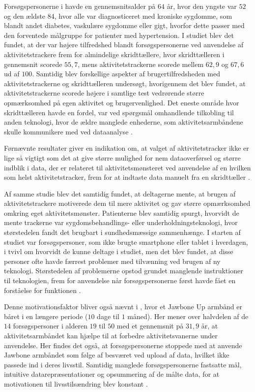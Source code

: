 Forsøgspersonerne i \citeauthor{mercer2016} havde en gennemsnitsalder på $64$ år, hvor den yngste var $52$ og den ældste $84$, hvor alle var diagnosticeret med kroniske sygdomme, som blandt andet diabetes, vaskulære sygdomme eller gigt, hvorfor dette passer med den forventede målgruppe for patienter med hypertension. I studiet blev det fundet, at der var højere tilfredshed blandt forsøgspersonerne ved anvendelse af aktivitetstrackere frem for almindelige skridttællere, hvor skridttælleren i gennemsnit scorede $55,7$, mens aktivitetstrackerne scorede mellem $62,9$ og $67,6$ ud af $100$. Samtidig blev forskellige aspekter af brugertilfredsheden med aktivitetstrackerne og skridttælleren undersøgt, hvorigennem det blev fundet, at aktivitetstrackerne scorede højere i samtlige test vedrørende større opmærksomhed på egen aktivitet og brugervenlighed. Det eneste område hvor skridttælleren havde en fordel, var ved spørgsmål omhandlende tilkobling til anden teknologi, hvor de ældre manglede enhederne, som aktivitetsarmbåndene skulle kommunikere med ved dataanalyse \citep{mercer2016}.

Førnævnte resultater giver en indikation om, at valget af aktivitetstracker ikke er lige så vigtigt som det at give større mulighed for nem dataoverførsel og større indblik i data, der er relateret til aktivitetsmønsteret ved anvendelse af en hvilken som helst aktivitetstracker, frem for at indtaste data manuelt fra en skridttæller \citep{mercer2016}.

Af samme studie blev det samtidig fundet, at deltagerne mente, at brugen af aktivitetstrackere motiverede dem til mere aktivitet og gav større opmærksomhed omkring eget aktivitetsmønster. Patienterne blev samtidig spurgt, hvorvidt de mente trackerne var sygdomsbehandlings- eller underholdningsteknologi, hvor størstedelen fandt det brugbart i sundhedsmæssige sammenhænge. I starten af studiet var forsøgspersoner, som ikke brugte smartphone eller tablet i hverdagen, i tvivl om hvorvidt de kunne deltage i studiet, men det blev fundet, at disse personer ofte havde færrest problemer med tilvænning ved brugen af ny teknologi. Størstedelen af problemerne opstod grundet manglende instruktioner til teknologien, frem for anvendelse når forsøgspersonerne først havde fået en forståelse for funktionen \citep{mercer2016}.

Denne motivationsfaktor bliver også nævnt i \citeauthor{rapp2016}, hvor et Jawbone Up armbånd er båret i en længere periode ($10$ dage til $1$ måned). Her mener over halvdelen af de $14$ forsøgspersoner i alderen $19$ til $50$ med et gennemsnit på $31,9$ år, at aktivitetsarmbåndet kan hjælpe til at forbedre aktivitetsvanerne under anvendelse. Her findes det også, at forsøgspersonerne stoppede med at anvende Jawbone armbåndet som følge af besværet ved upload af data, hvilket ikke passede ind i deres livsstil. Samtidig manglede forsøgspersonerne fastsatte mål, intuitive datarepræsentationer og opsummering af de målte data, for at motivationen til livsstilsændring blev konstant \citep{rapp2016}.

